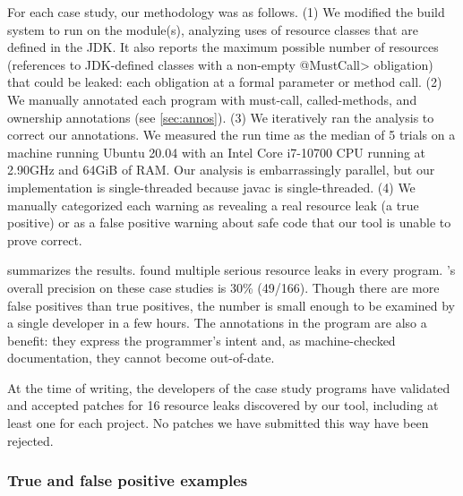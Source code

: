 For each case study, our methodology was as follows.
(1)
We modified the
build system to run \tool on the module(s), analyzing uses of resource
classes that are defined in the JDK\@.
It also reports the maximum possible number of resources (references to JDK-defined
classes with a non-empty \<@MustCall> obligation) that could be
leaked:  each obligation at a formal parameter or method call.
(2) We manually
annotated each program with must-call, called-methods, and ownership
annotations (see \cref{sec:annos}).
(3) We iteratively ran the analysis to correct our annotations.
We measured the run time
as the median of 5 trials on
a machine running Ubuntu 20.04 with an Intel Core i7-10700 CPU running at 2.90GHz and 64GiB of RAM\@.
Our analysis is embarrassingly parallel, but our implementation is
single-threaded because javac is single-threaded.
(4) We manually categorized each warning as revealing a
real resource leak (a true positive) or as a
false positive warning about safe code that our tool is unable to prove correct.

 summarizes the results. \Tool found multiple
serious resource leaks in every program. \Tool's overall precision on
these case studies is 30\% (49/166). Though there are more false positives
than true positives,
the number is small enough to be examined by a single developer in a
few hours.
The annotations in the program are
also a benefit: they
express the programmer's intent and, as machine-checked documentation,
they cannot become out-of-date.

%
At the time of writing,
the developers of the case study programs have validated and accepted
patches for 16 resource leaks discovered by our tool, including at least
one for each project.
No patches we have submitted this way have been rejected.

\subsubsection{True and false positive examples}
\label{sec:examples}

